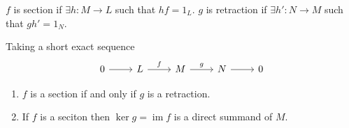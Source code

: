\documentclass[11pt, a4paper]{report}
\begin{document}
$ f $ is section if $ \exists h: M\to L $ such that $ hf=1_L $. $ g $ is retraction if $ \exists h': N\to M $ such that $ gh'=1_N $.  

\begin{theorem} 
Taking a short exact sequence 
\[
\begin{tikzcd}
0 \arrow[r] & L \arrow[r, "f"] & M \arrow[r, "g"] & N \arrow[r] & 0
\end{tikzcd}
\]
\begin{enumerate}
\item $ f $ is a section if and only if $ g $ is a retraction.
\item If $ f $ is a seciton then $ \operatorname{ker}g = \operatorname{im}f $ is a direct summand of $ M $.
\end{enumerate}
\end{theorem}
\end{document}
